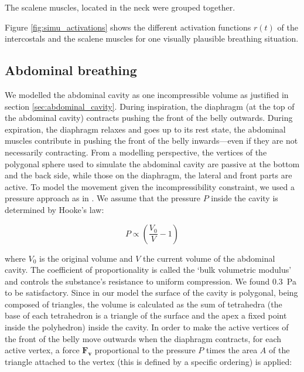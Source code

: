 The scalene muscles, located in the neck were grouped together.

Figure \ref{fig:simu_activations} shows the different activation functions $r(t)$ of the intercostals and the scalene muscles for one visually plausible breathing situation.

\subsection{Abdominal breathing}
We modelled the abdominal cavity as one incompressible volume as justified in section \ref{sec:abdominal_cavity}. During inspiration, the diaphragm (at the top of the abdominal cavity) contracts pushing the front of the belly outwards. During expiration, the diaphragm relaxes and goes up to its rest state, the abdominal muscles contribute in pushing the front of the belly inwards---even if they are not necessarily contracting. From a modelling perspective, the vertices of the polygonal sphere used to simulate the abdominal cavity are passive at the bottom and the back side, while those on the diaphragm, the lateral and front parts are active. To model the movement given the incompressibility constraint, we used a pressure approach as in \cite{dilorenzo2009breathing}. We assume that the pressure $P$ inside the cavity is determined by Hooke's law:

\begin{equation}P \propto \left(\frac{V_{0}}{V} - 1\right) \end{equation}

where $V_{0}$ is the original volume and $V$ the current volume of the abdominal cavity. The coefficient of proportionality is called the `bulk volumetric modulus' and controls the substance's resistance to uniform compression. We found 0.3~Pa to be satisfactory. Since in our model the surface of the cavity is polygonal, being composed of triangles, the volume is calculated as the sum of tetrahedra (the base of each tetrahedron is a triangle of the surface and the apex a fixed point inside the polyhedron) inside the cavity. In order to make the active vertices of the front of the belly move outwards when the diaphragm contracts, for each active vertex, a force $\mathbf{F_{v}}$ proportional to the pressure $P$ times the area $A$ of the triangle attached to the vertex (this is defined by a specific ordering) is applied:

